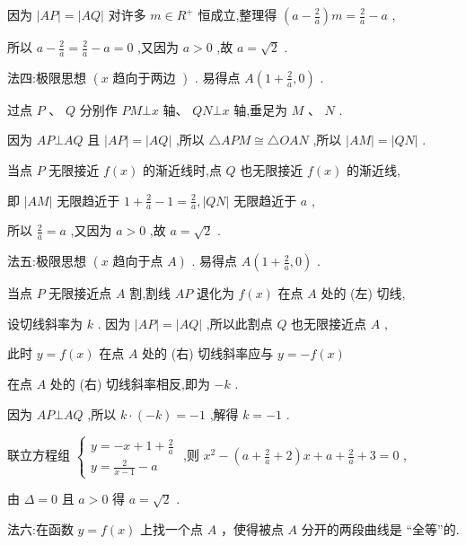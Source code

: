 \documentclass[10pt]{article}
\begin{document}
因为 \(\left| {AP}\right|  = \left| {AQ}\right|\) 对许多 \(m \in  {R}^{ + }\) 恒成立,整理得 \(\left( {a - \frac{2}{a}}\right) m = \frac{2}{a} - a\) ,

所以 \(a - \frac{2}{a} = \frac{2}{a} - a = 0\) ,又因为 \(a > 0\) ,故 \(a = \sqrt{2}\) .

法四:极限思想 \(\left( {x\text{ 趋向于两边 }}\right)\) . 易得点 \(A\left( {1 + \frac{2}{a},0}\right)\) .

过点 \(P\text{ 、 }Q\) 分别作 \({PM} \bot  x\) 轴、 \({QN} \bot  x\) 轴,垂足为 \(M\text{ 、 }N\) .

因为 \({AP} \bot  {AQ}\) 且 \(\left| {AP}\right|  = \left| {AQ}\right|\) ,所以 \(\bigtriangleup {APM} \cong  \bigtriangleup {OAN}\) ,所以 \(\left| {AM}\right|  = \left| {QN}\right|\) .

当点 \(P\) 无限接近 \(f\left( x\right)\) 的渐近线时,点 \(Q\) 也无限接近 \(f\left( x\right)\) 的渐近线,

即 \(\left| {AM}\right|\) 无限趋近于 \(1 + \frac{2}{a} - 1 = \frac{2}{a},\left| {QN}\right|\) 无限趋近于 \(a\) ,

所以 \(\frac{2}{a} = a\) ,又因为 \(a > 0\) ,故 \(a = \sqrt{2}\) .

法五:极限思想 \(\left( {x\text{ 趋向于点 }A}\right)\) . 易得点 \(A\left( {1 + \frac{2}{a},0}\right)\) .

当点 \(P\) 无限接近点 \(A\) 割,割线 \({AP}\) 退化为 \(f\left( x\right)\) 在点 \(A\) 处的 (左) 切线,

设切线斜率为 \(k\) . 因为 \(\left| {AP}\right|  = \left| {AQ}\right|\) ,所以此割点 \(Q\) 也无限接近点 \(A\) ,

此时 \(y = f\left( x\right)\) 在点 \(A\) 处的 (右) 切线斜率应与 \(y =  - f\left( x\right)\)

在点 \(A\) 处的 (右) 切线斜率相反,即为 \(- k\) .

因为 \({AP} \bot  {AQ}\) ,所以 \(k \cdot  \left( {-k}\right)  =  - 1\) ,解得 \(k =  - 1\) .

联立方程组 \(\left\{  \begin{array}{l} y =  - x + 1 + \frac{2}{a} \\  y = \frac{2}{x - 1} - a \end{array}\right.\) ,则 \({x}^{2} - \left( {a + \frac{2}{a} + 2}\right) x + a + \frac{2}{a} + 3 = 0\) ,

由 \(\Delta  = 0\) 且 \(a > 0\) 得 \(a = \sqrt{2}\) .

法六:在函数 \(y = f\left( x\right)\) 上找一个点 \(A\) ，使得被点 \(A\) 分开的两段曲线是 “全等”的.
\end{document}

